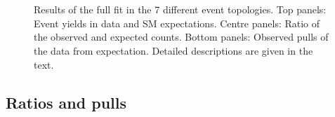 \begin{figure}[!h]
{  }\\
  ~ 
  \\
  \caption{\label{fig:full-fit} Results of the full fit in the 7 different event topologies.
  Top panels:  Event yields in data and SM expectations.
  Centre panels:  Ratio of the observed and expected counts.
  Bottom panels:  Observed pulls of the data from expectation.
  Detailed descriptions are given in the text.
	}
\end{figure}

\clearpage
\subsection{Ratios and pulls}

